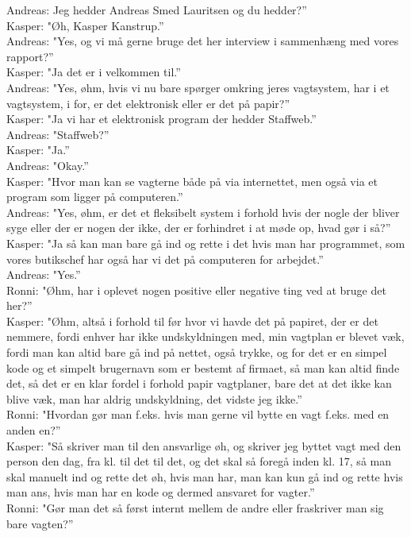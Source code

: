 Andreas: Jeg hedder Andreas Smed Lauritsen og du hedder?”\\
Kasper: "Øh, Kasper Kanstrup.”\\
Andreas: "Yes, og vi må gerne bruge det her interview i sammenhæng med vores rapport?”\\
Kasper: "Ja det er i velkommen til.”\\
Andreas: "Yes, øhm, hvis vi nu bare spørger omkring jeres vagtsystem, har i et vagtsystem, i for, er det elektronisk eller er det på papir?”\\
Kasper: "Ja vi har et elektronisk program der hedder Staffweb.”\\
Andreas: "Staffweb?”\\
Kasper: "Ja.”\\
Andreas: "Okay.”\\
Kasper: "Hvor man kan se vagterne både på via internettet, men også via et program som ligger på computeren.”\\
Andreas: "Yes, øhm, er det et fleksibelt system i forhold hvis der nogle der bliver syge eller der er nogen der ikke, der er forhindret i at møde op, hvad gør i så?”\\
Kasper: "Ja så kan man bare gå ind og rette i det hvis man har programmet, som vores butikschef har også har vi det på computeren for arbejdet.”\\
Andreas: "Yes.”\\
Ronni: "Øhm, har i oplevet nogen positive eller negative ting ved at bruge det her?”\\
Kasper: "Øhm, altså i forhold til før hvor vi havde det på papiret, der er det nemmere, fordi enhver har ikke undskyldningen med, min vagtplan er blevet væk, fordi man kan altid bare gå ind på nettet, også trykke, og for det er en simpel kode og et simpelt brugernavn som er bestemt af firmaet, så man kan altid finde det, så det er en klar fordel i forhold papir vagtplaner, bare det at det ikke kan blive væk, man har aldrig undskyldning, det vidste jeg ikke.”\\
Ronni: "Hvordan gør man f.eks. hvis man gerne vil bytte en vagt f.eks. med en anden en?”\\
Kasper: "Så skriver man til den ansvarlige øh, og skriver jeg byttet vagt med den person den dag, fra kl. til det til det, og det skal så foregå inden kl. 17, så man skal manuelt ind og rette det øh, hvis man har, man kan kun gå ind og rette hvis man ans, hvis man har en kode og dermed ansvaret for vagter.”\\
Ronni: "Gør man det så først internt mellem de andre eller fraskriver man sig bare vagten?”\\

